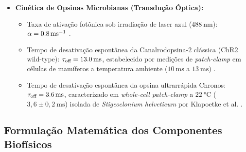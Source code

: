 \documentclass[11pt,a4paper,article,brazil]{abntex2}
\begin{document}
\begin{itemize}
          \begin{itemize}
              \item Tempo de reciclagem e ancoragem vesicular: $\tau_{\text{rec}} = \qty{600}{\milli\second}$, medido experimentalmente em fatias de hipocampo \cite{tsodyks1998}.
              \item Fração de liberação por evento pré-sináptico: $U = 0{,}45$, refletindo a probabilidade de exocitose vesicular basal \cite{tsodyks1998}.
              \item Constante de decaimento inibitório perissomático mediado por cloreto: $\tau_{\text{GABA}} = \qty{6}{\milli\second}$, com potencial de reversão $E_{\text{GABA}} = \qty{-75}{\milli\volt}$.
          \end{itemize}
    \item \textbf{Cinética de Opsinas Microbianas (Transdução Óptica):}
          \begin{itemize}
              \item Taxa de ativação fotônica sob irradiação de laser azul ($\qty{488}{\nano\meter}$): $\alpha = \qty{0{,}8}{\per\milli\second}$ \cite{grossman2011}.
              \item Tempo de desativação espontânea da Canalrodopsina-2 clássica (ChR2 wild-type): $\tau_{\text{off}} = \qty{13{,}0}{\milli\second}$, estabelecido por medições de \emph{patch-clamp} em células de mamíferos a temperatura ambiente ($\qty{10}{\milli\second}$ a $\qty{13}{\milli\second}$) \cite{nagel2003, grossman2011}.
              \item Tempo de desativação espontânea da opsina ultrarrápida Chronos: $\tau_{\text{off}} = \qty{3{,}6}{\milli\second}$, caracterizado em \emph{whole-cell patch-clamp} a $\qty{22}{\degreeCelsius}$ ($3{,}6 \pm 0{,}2\ \unit{\milli\second}$) isolada de \emph{Stigeoclonium helveticum} por Klapoetke et al. \cite{klapoetke2014}.
          \end{itemize}
\end{itemize}

\subsection{Formulação Matemática dos Componentes Biofísicos}
\end{document}
